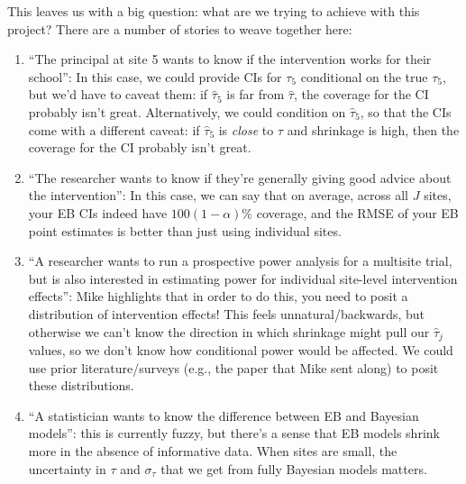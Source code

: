 \documentclass[]{article}
\begin{document}
This leaves us with a big question: what are we trying to achieve with this project?
There are a number of stories to weave together here:
\begin{enumerate}
	\item ``The principal at site 5 wants to know if the intervention works for their school'': In this case, we could provide CIs for $\tau_5$ conditional on the true $\tau_5$, but we'd have to caveat them: if $\hat{\tau}_5$ is far from $\hat{\tau}$, the coverage for the CI probably isn't great.
	Alternatively, we could condition on $\hat{\tau}_5$, so that the CIs come with a different caveat: if $\hat{\tau}_5$ is \textit{close} to $\hat{\tau}$ and shrinkage is high, then the coverage for the CI probably isn't great.
	\item ``The researcher wants to know if they're generally giving good advice about the intervention'': In this case, we can say that on average, across all $J$ sites, your EB CIs indeed have $100(1-\alpha)$\% coverage, and the RMSE of your EB point estimates is better than just using individual sites.
	\item ``A researcher wants to run a prospective power analysis for a multisite trial, but is also interested in estimating power for individual site-level intervention effects'': Mike highlights that in order to do this, you need to posit a distribution of intervention effects! 	
	This feels unnatural/backwards, but otherwise we can't know the direction in which shrinkage might pull our $\hat{\tau}_j$ values, so we don't know how conditional power would be affected.
	We could use prior literature/surveys (e.g., the paper that Mike sent along) to posit these distributions.
	\item ``A statistician wants to know the difference between EB and Bayesian models'': this is currently fuzzy, but there's a sense that EB models shrink more in the absence of informative data. When sites are small, the uncertainty in $\tau$ and $\sigma_\tau$ that we get from fully Bayesian models matters.
\end{enumerate}

\end{document}
